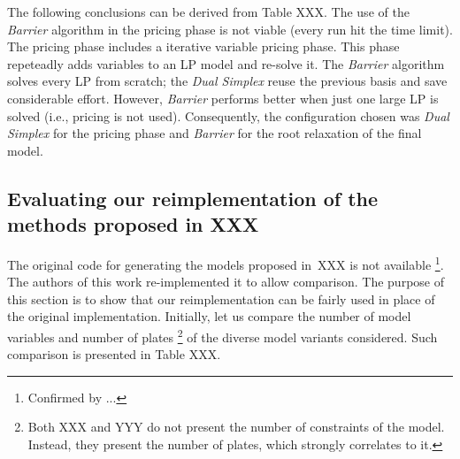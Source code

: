 \documentclass[smallextended]{svjour3}       %
\begin{document}
The following conclusions can be derived from Table XXX.
The use of the \emph{Barrier} algorithm in the pricing phase is not viable (every run hit the time limit).
The pricing phase includes a iterative variable pricing phase.
This phase repeteadly adds variables to an LP model and re-solve it.
The \emph{Barrier} algorithm solves every LP from scratch;
the \emph{Dual Simplex} reuse the previous basis and save considerable effort.
However, \emph{Barrier} performs better when just one large LP is solved
(i.e., pricing is not used).
Consequently, the configuration chosen was \emph{Dual Simplex} for the pricing phase and \emph{Barrier} for the root relaxation of the final model.

\subsection{Evaluating our reimplementation of the methods proposed in XXX}

The original code for generating the models proposed in~XXX is not available
\footnote{Confirmed by ...}.
The authors of this work re-implemented it to allow comparison.
The purpose of this section is to show that our reimplementation can be fairly used in place of the original implementation.
Initially, let us compare the number of model variables and number of plates
\footnote{
Both XXX and YYY do not present the number of constraints of the model.
Instead, they present the number of plates, which strongly correlates to it.
} of the diverse model variants considered.
Such comparison is presented in Table XXX.
\end{document}
